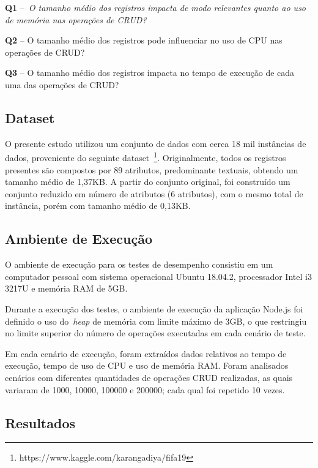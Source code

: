 \documentclass[12pt]{article}
\begin{document}
\textbf{Q1} --~\emph{O tamanho médio dos registros impacta de modo relevantes quanto ao uso de memória nas operações de CRUD?}

\textbf{Q2} -- O tamanho médio dos registros pode influenciar no uso de CPU nas operações de CRUD? 

\textbf{Q3} -- O tamanho médio dos registros impacta no tempo de execução de cada uma das operações de CRUD?


\subsection{Dataset}

O presente estudo utilizou um conjunto de dados com cerca 18 mil instâncias de dados, proveniente do seguinte dataset~\footnote{https://www.kaggle.com/karangadiya/fifa19}.
Originalmente, todos os registros presentes são compostos por 89 atributos, predominante textuais, obtendo um tamanho médio de 1,37KB.
A partir do conjunto original, foi construído um conjunto reduzido em número de atributos (6 atributos), com o mesmo total de instância, porém com tamanho médio de 0,13KB.


\subsection{Ambiente de Execução}

O ambiente de execução para os testes de desempenho consistiu em um computador pessoal com sistema operacional Ubuntu 18.04.2, processador Intel i3 3217U e memória RAM de 5GB. 

Durante a execução dos testes, o ambiente de execução da aplicação Node.js foi definido o uso do~\emph{heap} de memória com limite máximo de 3GB, o que restringiu no limite superior do número de operações executadas em cada cenário de teste.

Em cada cenário de execução, foram extraídos dados relativos ao tempo de execução, tempo de uso de CPU e uso de memória RAM.
Foram analisados cenários com diferentes quantidades de operações CRUD realizadas, as quais variaram de 1000, 10000, 100000 e 200000; cada qual foi repetido 10 vezes. 

\subsection{Resultados}
\label{section:resultados}
\end{document}
